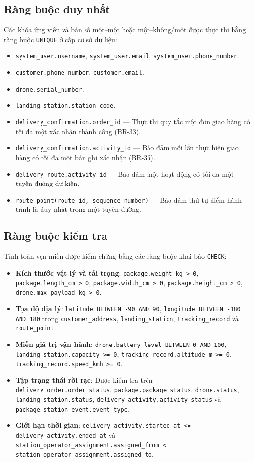 \subsection{Ràng buộc duy nhất}
Các khóa ứng viên và bản số một--một hoặc một--không/một được thực thi bằng ràng buộc \texttt{UNIQUE} ở cấp cơ sở dữ liệu:
\begin{itemize}
    \item \texttt{system\_user.username}, \texttt{system\_user.email}, \texttt{system\_user.phone\_number}.
    \item \texttt{customer.phone\_number}, \texttt{customer.email}.
    \item \texttt{drone.serial\_number}.
    \item \texttt{landing\_station.station\_code}.
    \item \texttt{delivery\_confirmation.order\_id} — Thực thi quy tắc một đơn giao hàng có tối đa một xác nhận thành công (BR-33).
    \item \texttt{delivery\_confirmation.activity\_id} — Bảo đảm mỗi lần thực hiện giao hàng có tối đa một bản ghi xác nhận (BR-35).
    \item \texttt{delivery\_route.activity\_id} — Bảo đảm một hoạt động có tối đa một tuyến đường dự kiến.
    \item \texttt{route\_point(route\_id, sequence\_number)} — Bảo đảm thứ tự điểm hành trình là duy nhất trong một tuyến đường.
\end{itemize}


\subsection{Ràng buộc kiểm tra}
Tính toàn vẹn miền được kiểm chứng bằng các ràng buộc khai báo \texttt{CHECK}:
\begin{itemize}
    \item \textbf{Kích thước vật lý và tải trọng}: \texttt{package.weight\_kg > 0}, \texttt{package.length\_cm > 0}, \texttt{package.width\_cm > 0}, \texttt{package.height\_cm > 0}, \texttt{drone.max\_payload\_kg > 0}.
    \item \textbf{Tọa độ địa lý}: \texttt{latitude BETWEEN -90 AND 90}, \texttt{longitude BETWEEN -180 AND 180} trong \texttt{customer\_address}, \texttt{landing\_station}, \texttt{tracking\_record} và \texttt{route\_point}.
    \item \textbf{Miền giá trị vận hành}: \texttt{drone.battery\_level BETWEEN 0 AND 100}, \texttt{landing\_station.capacity >= 0}, \texttt{tracking\_record.altitude\_m >= 0}, \texttt{tracking\_record.speed\_kmh >= 0}.
    \item \textbf{Tập trạng thái rời rạc}: Được kiểm tra trên \texttt{delivery\_order.order\_status}, \texttt{package.package\_status}, \texttt{drone.status}, \texttt{landing\_station.status}, \texttt{delivery\_activity.activity\_status} và \texttt{package\_station\_event.event\_type}.
    \item \textbf{Giới hạn thời gian}: \texttt{delivery\_activity.started\_at <= delivery\_activity.ended\_at} và \texttt{station\_operator\_assignment.assigned\_from < station\_operator\_assignment.assigned\_to}.
\end{itemize}

